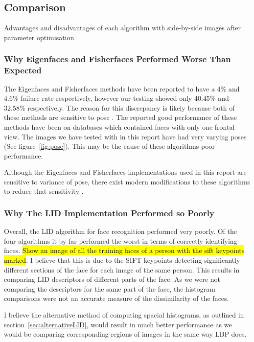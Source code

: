 \documentclass{article}
\begin{document}
\subsection{Comparison}
Advantages and disadvantages of each algorithm with side-by-side images after parameter optimisation

\subsubsection{Why Eigenfaces and Fisherfaces Performed Worse Than Expected}
The Eigenfaces and Fisherfaces methods have been reported to have a 4\%\cite{turk1991eigenfaces} and 4.6\%\cite{belhumeur1997eigenfaces} failure rate respectively, however our testing showed only 40.45\% and 32.58\% respectively. The reason for this discrepancy is likely because both of these methods are sensitive to pose \cite{turk1991eigenfaces}\cite{belhumeur1997eigenfaces}. The reported good performance of these methods have been on databases which contained faces with only one frontal view. The images we have tested with in this report have had very varying poses (See figure~\ref{fig:pose}). This may be the cause of these algorithms poor performance.

Although the Eigenfaces and Fisherfaces implementations used in this report are sensitive to variance of pose, there exist modern modifications to these algorithms to reduce that sensitivity \cite{jaiswal2012local}.

\subsubsection{Why The LID Implementation Performed so Poorly}
Overall, the LID algorithm for face recognition performed very poorly. Of the four algorithms it by far performed the worst in terms of correctly identifying faces. \hl{Show an image of all the training faces of a person with the sift keypoints marked}. I believe that this is due to the SIFT keypoints detecting significantly different sections of the face for each image of the same person. This results in comparing LID descriptors of different parts of the face. As we were not comparing the descriptors for the same part of the face, the histogram comparisons were not an accurate measure of the dissimilarity of the faces.

I believe the alternative method of computing spacial histograms, as outlined in section~\ref{sec:alternativeLID}, would result in much better performance as we would be comparing corresponding regions of images in the same way LBP does.
\end{document}
